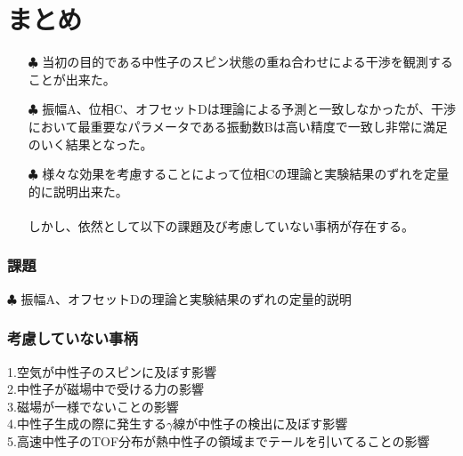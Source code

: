 
\section{まとめ}
\begin{itemize}
\item[$\clubsuit$]当初の目的である中性子のスピン状態の重ね合わせによる干渉を観測することが出来た。\\
\item[$\clubsuit$]振幅A、位相C、オフセットDは理論による予測と一致しなかったが、干渉において最重要なパラメータである振動数Bは高い精度で一致し非常に満足のいく結果となった。\\
\item[$\clubsuit$]様々な効果を考慮することによって位相Cの理論と実験結果のずれを定量的に説明出来た。\\
\\
しかし、依然として以下の課題及び考慮していない事柄が存在する。
\end{itemize}
\subsubsection{課題}
$\clubsuit$
振幅A、オフセットDの理論と実験結果のずれの定量的説明\\
\subsubsection{考慮していない事柄}
\hspace{-9.5pt}1.空気が中性子のスピンに及ぼす影響\\
2.中性子が磁場中で受ける力の影響\\
3.磁場が一様でないことの影響\\
4.中性子生成の際に発生する$\gamma$線が中性子の検出に及ぼす影響\\
5.\mbox{高速中性子のTOF分布が熱中性子の領域までテールを引いてることの影響}\\
